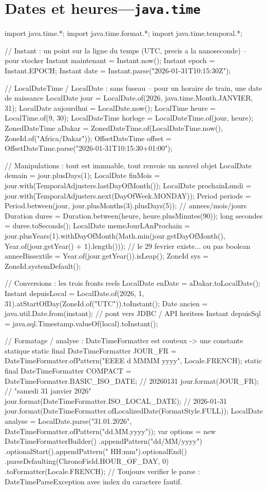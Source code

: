 \documentclass[12pt,a4paper,twoside,openright]{book}
\begin{document}
\section{Dates et heures---\texttt{java.time}}

\begin{codejava}
import java.time.*;
import java.time.format.*;
import java.time.temporal.*;

// Instant : un point sur la ligne du temps (UTC, precis a la nanoseconde) -- pour stocker
Instant maintenant = Instant.now();
Instant epoch = Instant.EPOCH;
Instant date = Instant.parse("2026-01-31T10:15:30Z");

// LocalDateTime / LocalDate : sans fuseau -- pour un horaire de train, une date de naissance
LocalDate jour = LocalDate.of(2026, java.time.Month.JANVIER, 31);
LocalDate aujourdhui = LocalDate.now();
LocalTime heure = LocalTime.of(9, 30);
LocalDateTime horloge = LocalDateTime.of(jour, heure);
ZonedDateTime aDakar = ZonedDateTime.of(LocalDateTime.now(), ZoneId.of("Africa/Dakar"));
OffsetDateTime offset = OffsetDateTime.parse("2026-01-31T10:15:30+01:00");

// Manipulations : tout est immuable, tout renvoie un nouvel objet
LocalDate demain = jour.plusDays(1);
LocalDate finMois = jour.with(TemporalAdjusters.lastDayOfMonth());
LocalDate prochainLundi = jour.with(TemporalAdjusters.next(DayOfWeek.MONDAY));
Period periode = Period.between(jour, jour.plusMonths(3).plusDays(5));   // annees/mois/jours
Duration duree = Duration.between(heure, heure.plusMinutes(90));
long secondes = duree.toSeconds();
LocalDate memeJourLAnProchain = jour.plusYears(1).withDayOfMonth(Math.min(jour.getDayOfMonth(),
        Year.of(jour.getYear() + 1).length()));      // le 29 fevrier existe... ou pas
boolean anneeBissextile = Year.of(jour.getYear()).isLeap();
ZoneId sys = ZoneId.systemDefault();

// Conversions : les trois fronts reels
LocalDate enDate = aDakar.toLocalDate();
Instant depuisLocal = LocalDate.of(2026, 1, 31).atStartOfDay(ZoneId.of("UTC")).toInstant();
Date ancien = java.util.Date.from(instant);                    // pont vers JDBC / API heritees
Instant depuisSql = java.sql.Timestamp.valueOf(local).toInstant();

// Formatage / analyse : DateTimeFormatter est couteux -> une constante statique
static final DateTimeFormatter JOUR_FR = DateTimeFormatter.ofPattern("EEEE d MMMM yyyy", Locale.FRENCH);
static final DateTimeFormatter COMPACT = DateTimeFormatter.BASIC_ISO_DATE;        // 20260131
jour.format(JOUR_FR);                              // "samedi 31 janvier 2026"
jour.format(DateTimeFormatter.ISO_LOCAL_DATE);       // 2026-01-31
jour.format(DateTimeFormatter.ofLocalizedDate(FormatStyle.FULL));
LocalDate analyse = LocalDate.parse("31.01.2026", DateTimeFormatter.ofPattern("dd.MM.yyyy"));
var options = new DateTimeFormatterBuilder()
        .appendPattern("dd/MM/yyyy")
        .optionalStart().appendPattern(" HH:mm").optionalEnd()
        .parseDefaulting(ChronoField.HOUR_OF_DAY, 0)
        .toFormatter(Locale.FRENCH);
// Toujours verifier le parse : DateTimeParseException avec index du caractere fautif.
\end{codejava}
\end{document}
